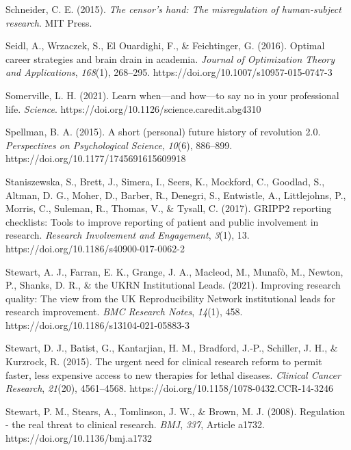 \documentclass[meta, authordate]{jote-new-article}
\begin{document}
Schneider, C. E. (2015). \emph{The censor’s hand: The misregulation of human-subject research}. MIT Press.



Seidl, A., Wrzaczek, S., El Ouardighi, F., & Feichtinger, G. (2016). Optimal career strategies and brain drain in academia. \emph{Journal of Optimization Theory and Applications}, \emph{168}(1), 268–295. https://doi.org/10.1007/s10957-015-0747-3



Somerville, L. H. (2021). Learn when—and how—to say no in your professional life. \emph{Science}. https://doi.org/10.1126/science.caredit.abg4310



Spellman, B. A. (2015). A short (personal) future history of revolution 2.0. \emph{Perspectives on Psychological Science}, \emph{10}(6), 886–899. https://doi.org/10.1177/1745691615609918



Staniszewska, S., Brett, J., Simera, I., Seers, K., Mockford, C., Goodlad, S., Altman, D. G., Moher, D., Barber, R., Denegri, S., Entwistle, A., Littlejohns, P., Morris, C., Suleman, R., Thomas, V., & Tysall, C. (2017). GRIPP2 reporting checklists: Tools to improve reporting of patient and public involvement in research. \emph{Research Involvement and Engagement}, \emph{3}(1), 13. https://doi.org/10.1186/s40900-017-0062-2



Stewart, A. J., Farran, E. K., Grange, J. A., Macleod, M., Munafò, M., Newton, P., Shanks, D. R., & the UKRN Institutional Leads. (2021). Improving research quality: The view from the UK Reproducibility Network institutional leads for research improvement. \emph{BMC Research Notes}, \emph{14}(1), 458. https://doi.org/10.1186/s13104-021-05883-3



Stewart, D. J., Batist, G., Kantarjian, H. M., Bradford, J.-P., Schiller, J. H., & Kurzrock, R. (2015). The urgent need for clinical research reform to permit faster, less expensive access to new therapies for lethal diseases. \emph{Clinical Cancer Research}, \emph{21}(20), 4561–4568. https://doi.org/10.1158/1078-0432.CCR-14-3246



Stewart, P. M., Stears, A., Tomlinson, J. W., & Brown, M. J. (2008). Regulation - the real threat to clinical research. \emph{BMJ}, \emph{337}, Article a1732. https://doi.org/10.1136/bmj.a1732
\end{document}
